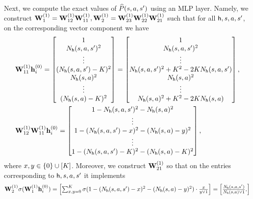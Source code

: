 Next, we compute the exact values of $\widehat{P}({s},{a},{s}')$ using an MLP layer. Namely, 
we  construct ${\mathbf W}^{(1)}_1={\mathbf W}^{(1)}_{12}{\mathbf W}^{(1)}_{11},{\mathbf W}^{(1)}_2={\mathbf W}^{(1)}_{23}{\mathbf W}^{(1)}_{22}{\mathbf W}^{(1)}_{21}$  such that for all ${\mathsf{h}},{s},{a},{s}'$, on the corresponding vector component we have
\begin{align*}
   & {\mathbf W}^{(1)}_{11}{\mathbf h}_i^{(0)}=     \begin{bmatrix}
    1\\
       {N}_{\mathsf{h}}({s},{a},{s}')^2 \\\vdots
       \\
        ({N}_{\mathsf{h}}({s},{a},{s}')-{K})^2\\
         {N}_{\mathsf{h}}({s},{a})^2 \\\vdots
       \\
        ({N}_{\mathsf{h}}({s},{a})-{K})^2
    \end{bmatrix}= \begin{bmatrix}
    1\\
       {N}_{\mathsf{h}}({s},{a},{s}')^2 \\\vdots
       \\
        {N}_{\mathsf{h}}({s},{a},{s}')^2+{K}^2-2{K}{N}_{\mathsf{h}}({s},{a},{s}')\\
          {N}_{\mathsf{h}}({s},{a})^2 \\\vdots
       \\
        {N}_{\mathsf{h}}({s},{a})^2+{K}^2-2{K}{N}_{\mathsf{h}}({s},{a})
    \end{bmatrix},
    \\
&{\mathbf W}^{(1)}_{12}{\mathbf W}^{(1)}_{11}{\mathbf h}_i^{(0)}=     \begin{bmatrix}
    1-
       {N}_{\mathsf{h}}({s},{a},{s}')^2 - {N}_{\mathsf{h}}({s},{a})^2 \\\vdots
       \\ 1-
       ({N}_{\mathsf{h}}({s},{a},{s}')-x)^2 - ({N}_{\mathsf{h}}({s},{a})-y)^2 \\\vdots\\
       1- ({N}_{\mathsf{h}}({s},{a},{s}')-{K})^2-({N}_{\mathsf{h}}({s},{a})-{K})^2
    \end{bmatrix} ,
\end{align*} where $x,y\in\{0\}\cup[{K}]$. Moreover,  we construct ${\mathbf W}^{(1)}_{21}$ so that on the entries corresponding to ${\mathsf{h}},{s},{a},{s}'$ it implements  
\begin{align*}
{\mathbf W}_{2}^{(1)}\sigma({\mathbf W}_{1}^{(1)}{\mathbf h}_i^{(0)})
    =\begin{bmatrix}
        \sum_{x,y=0}^{{K}}\sigma(1- ({N}_{\mathsf{h}}({s},{a},{s}')-x)^2 - ({N}_{\mathsf{h}}({s},{a})-y)^2)\cdot\frac{x}{y\vee1}
    \end{bmatrix}=\begin{bmatrix}
        \frac{{N}_{\mathsf{h}}({s},{a},{s}')}{{N}_{\mathsf{h}}({s},{a})\vee1}.
    \end{bmatrix}
\end{align*} 

